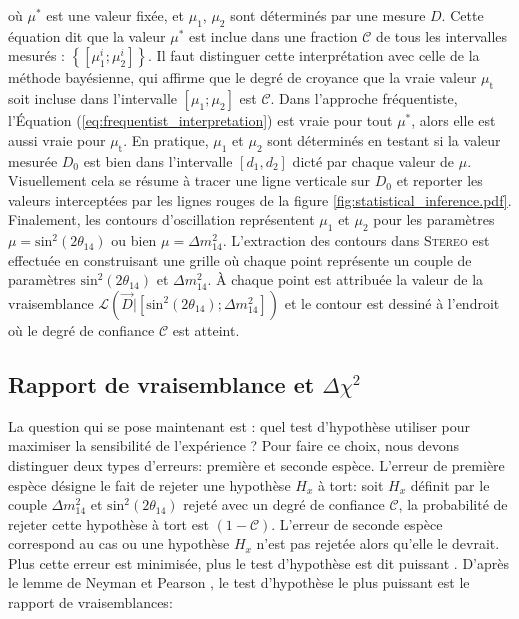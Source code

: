 où $\mu^*$ est une valeur fixée, et $\mu_1$, $\mu_2$ sont déterminés par une mesure $D$. Cette équation dit que la valeur $\mu^*$ est inclue dans une fraction $\mathcal{C}$ de tous les intervalles mesurés : $\left\{ [\mu_1^i;\mu_2^i] \right\}$. Il faut distinguer cette interprétation avec celle de la méthode bayésienne, qui affirme que le degré de croyance que la vraie valeur $\mu_\textrm{t}$ soit incluse dans l'intervalle $[\mu_1;\mu_2]$ est $\mathcal{C}$. Dans l'approche fréquentiste, l'Équation (\ref{eq:frequentist_interpretation}) est vraie pour tout $\mu^*$, alors elle est aussi vraie pour $\mu_\textrm{t}$. En pratique, $\mu_1$ et $\mu_2$ sont déterminés en testant si la valeur mesurée $D_0$ est bien dans l'intervalle $[d_1, d_2]$ dicté par chaque valeur de $\mu$. Visuellement cela se résume à tracer une ligne verticale sur $D_0$ et reporter les valeurs interceptées par les lignes rouges de la figure \ref{fig:statistical_inference.pdf}. Finalement, les contours d'oscillation représentent $\mu_1$ et $\mu_2$ pour les paramètres $\mu = \textrm{sin}^2(2\theta_{14})$ ou bien $\mu = \Delta m_{14}^2$. L'extraction des contours dans \textsc{Stereo} est effectuée en construisant une grille où chaque point représente un couple de paramètres $\textrm{sin}^2(2\theta_{14})$ et $\Delta m_{14}^2$. À chaque point est attribuée la valeur de la vraisemblance $\mathcal{L}(\overrightarrow{D} | [\textrm{sin}^2(2\theta_{14}); \Delta m_{14}^2] )$ et le contour est dessiné à l'endroit où le degré de confiance $\mathcal{C}$ est atteint.

\bigbreak

\subsection{Rapport de vraisemblance et $\Delta \chi^2$}

La question qui se pose maintenant est : quel test d'hypothèse utiliser pour maximiser la sensibilité de l'expérience ? Pour faire ce choix, nous devons distinguer deux types d'erreurs: première et seconde espèce. L'erreur de première espèce désigne le fait de rejeter une hypothèse $H_x$ à tort: soit $H_x$ définit par le couple $\Delta m^2_{14}$ et $\textrm{sin}^2(2\theta_{14})$ rejeté avec un degré de confiance $\mathcal{C}$, la probabilité de rejeter cette hypothèse à tort est $(1 - \mathcal{C})$. L'erreur de seconde espèce correspond au cas ou une hypothèse $H_x$ n'est pas rejetée alors qu'elle le devrait. Plus cette erreur est minimisée, plus le test d'hypothèse est dit \og puissant \fg{}. D'après le lemme de Neyman et Pearson \cite{1933RSPTA.231..289N}, le test d'hypothèse le plus puissant est le rapport de vraisemblances:

